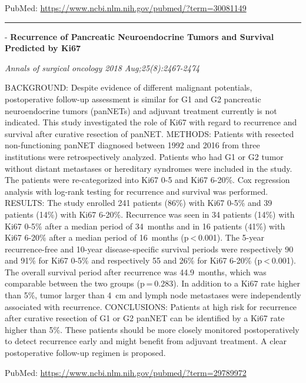 \documentclass[]{article}
\begin{document}
PubMed: \url{https://www.ncbi.nlm.nih.gov/pubmed/?term=30081149}

{}

{}

\begin{center}\rule{0.5\linewidth}{\linethickness}\end{center}

 - \textbf{Recurrence of Pancreatic Neuroendocrine Tumors and Survival
Predicted by Ki67}

\emph{Annals of surgical oncology 2018 Aug;25(8):2467-2474}

BACKGROUND: Despite evidence of different malignant potentials,
postoperative follow-up assessment is similar for G1 and G2 pancreatic
neuroendocrine tumors (panNETs) and adjuvant treatment currently is not
indicated. This study investigated the role of Ki67 with regard to
recurrence and survival after curative resection of panNET. METHODS:
Patients with resected non-functioning panNET diagnosed between 1992 and
2016 from three institutions were retrospectively analyzed. Patients who
had G1 or G2 tumor without distant metastases or hereditary syndromes
were included in the study. The patients were re-categorized into Ki67
0-5 and Ki67 6-20\%. Cox regression analysis with log-rank testing for
recurrence and survival was performed. RESULTS: The study enrolled 241
patients (86\%) with Ki67 0-5\% and 39 patients (14\%) with Ki67 6-20\%.
Recurrence was seen in 34 patients (14\%) with Ki67 0-5\% after a median
period of 34~months and in 16 patients (41\%) with Ki67 6-20\% after a
median period of 16~months (p \textless{} 0.001). The 5-year
recurrence-free and 10-year disease-specific survival periods were
respectively 90 and 91\% for Ki67 0-5\% and respectively 55 and 26\% for
Ki67 6-20\% (p \textless{} 0.001). The overall survival period after
recurrence was 44.9~months, which was comparable between the two groups
(p = 0.283). In addition to a Ki67 rate higher than 5\%, tumor larger
than 4~cm and lymph node metastases were independently associated with
recurrence. CONCLUSIONS: Patients at high risk for recurrence after
curative resection of G1 or G2 panNET can be identified by a Ki67 rate
higher than 5\%. These patients should be more closely monitored
postoperatively to detect recurrence early and might benefit from
adjuvant treatment. A clear postoperative follow-up regimen is proposed.

PubMed: \url{https://www.ncbi.nlm.nih.gov/pubmed/?term=29789972}

{}
\end{document}
